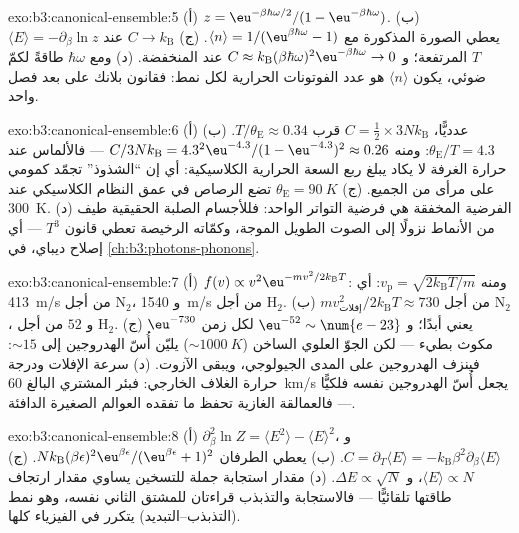 \begin{solution}{exo:b3:canonical-ensemble:5}
(أ) $z = \eu^{-\beta\hbar\omega/2}/(1 - \eu^{-\beta\hbar\omega})$.
(ب) $\langle E\rangle = -\partial_\beta\ln z$ يعطي الصورة
المذكورة مع $\langle n\rangle = 1/(\eu^{\beta\hbar\omega} - 1)$. (ج)
$C \to k_{\text{B}}$ عند $T$ المرتفعة؛ و $C \approx k_{\text{B}}(\beta
\hbar\omega)^2\eu^{-\beta\hbar\omega} \to 0$ عند المنخفضة. (د) ومع
$\hbar\omega$ طاقةً لكمّ ضوئي، يكون $\langle n\rangle$ هو
عدد الفوتونات الحرارية لكل نمط: فقانون بلانك على بعد فصل
واحد.
\end{solution}

\begin{solution}{exo:b3:canonical-ensemble:6}
(أ) عدديًّا، $C = \tfrac12 \times 3Nk_{\text{B}}$ قرب
$T/\theta_{\text{E}} \approx 0.34$. (ب) $\theta_{\text{E}}/T =
4.3$: ومنه $C/3Nk_{\text{B}} = 4.3^2\eu^{-4.3}/(1 - \eu^{-4.3})^2
\approx 0.26$ --- فالألماس عند حرارة الغرفة لا يكاد يبلغ ربع
السعة الحرارية الكلاسيكية: أي إن ``الشذوذ'' تجمّد كمومي
على مرأى من الجميع. (ج) $\theta_{\text{E}} = \qty{90}{K}$
تضع الرصاص في عمق النظام الكلاسيكي عند \qty{300}{K}. (د) الفرضية
المخفقة هي فرضية التواتر الواحد: فللأجسام الصلبة الحقيقية طيف من الأنماط
نزولًا إلى الصوت الطويل الموجة، وكمّاته الرخيصة تعطي قانون $T^3$
--- أي إصلاح ديباي، في \cref{ch:b3:photons-phonons}.
\end{solution}

\begin{solution}{exo:b3:canonical-ensemble:7}
(أ) $f(v) \propto v^2\eu^{-mv^2/2k_{\text{B}}T}$: ومنه $v_{\text{p}} =
\sqrt{2k_{\text{B}}T/m}$: أي \qty{413}{m/s} من أجل N$_2$، و
\qty{1540}{m/s} من أجل H$_2$. (ب) $mv_{\text{إفلات}}^2/2k_{\text{B}}T
\approx 730$ من أجل N$_2$، و $52$ من أجل H$_2$. (ج) $\eu^{-730}$ يعني
أبدًا؛ و $\eu^{-52} \sim \num{e-23}$ لكل زمن مكوث بطيء ---
لكن الجوّ العلوي الساخن ($\sim\qty{1000}{K}$) يليّن
أُسّ الهدروجين إلى $\sim15$: فينزف الهدروجين على المدى
الجيولوجي، ويبقى الآزوت. (د) سرعة الإفلات ودرجة حرارة
الغلاف الخارجي: فبئر المشتري البالغ \qty{60}{km/s} يجعل أُسّ الهدروجين
نفسه فلكيًّا --- فالعمالقة الغازية تحفظ ما تفقده العوالم الصغيرة الدافئة.
\end{solution}

\begin{solution}{exo:b3:canonical-ensemble:8}
(أ) $\partial_\beta^2\ln Z = \langle E^2\rangle - \langle
E\rangle^2$، و $C = \partial_T\langle E\rangle =
-k_{\text{B}}\beta^2\partial_\beta\langle E\rangle$. (ب) يعطي
الطرفان $Nk_{\text{B}}(\beta\epsilon)^2\eu^{\beta\epsilon}/(
\eu^{\beta\epsilon} + 1)^2$. (ج) $\langle E\rangle \propto N$، و
$\Delta E \propto \sqrt N$. (د) مقدار استجابة جملة
للتسخين يساوي مقدار ارتجاف طاقتها تلقائيًّا ---
فالاستجابة والتذبذب قراءتان للمشتق الثاني
نفسه، وهو نمط (التذبذب--التبديد) يتكرر
في الفيزياء كلها.
\end{solution}


